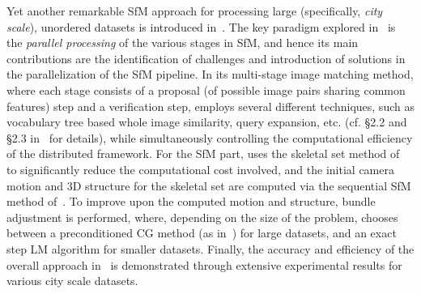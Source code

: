 \documentclass[10pt]{article}
\begin{document}
Yet another remarkable SfM approach for processing large (specifically, \textit{city scale}), unordered datasets is introduced in~\cite{SnavelyRome}. The key paradigm explored in~\cite{SnavelyRome} is the \textit{parallel processing} of the various stages in SfM, and hence its main contributions are the identification of challenges and introduction of solutions in the parallelization of the SfM pipeline. In its multi-stage image matching method, where each stage consists of a proposal (of possible image pairs sharing common features) step and a verification step, \cite{SnavelyRome} employs several different techniques, such as vocabulary tree based whole image similarity, query expansion, etc. (cf. \S2.2 and \S2.3 in~\cite{SnavelyRome} for details), while simultaneously controlling the computational efficiency of the distributed framework. For the SfM part, \cite{SnavelyRome} uses the skeletal set method of~\cite{SnavelySkeletal} to significantly reduce the computational cost involved, and the initial camera motion and $3$D structure for the skeletal set are computed via the sequential SfM method of~\cite{SnavelyData}. To improve upon the computed motion and structure, bundle adjustment is performed, where, depending on the size of the problem, \cite{SnavelyRome} chooses between a preconditioned CG method (as in~\cite{SnavelyBALarge}) for large datasets, and an exact step LM algorithm for smaller datasets. Finally, the accuracy and efficiency of the overall approach in~\cite{SnavelyRome} is demonstrated through extensive experimental results for various city scale datasets.
\end{document}
